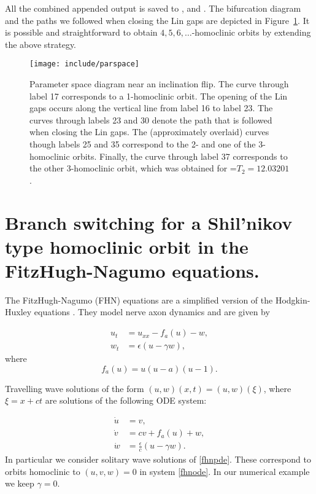 \documentclass[12pt]{report}
\begin{document}
All the combined appended output is saved to , 
and .
The bifurcation diagram and the paths we followed when closing the Lin
gaps are depicted in Figure~\ref{parspace}. It is possible and
straightforward to obtain $4, 5, 6, \dots$-homoclinic orbits by 
extending the above strategy.
\begin{figure}[htb]
\begin{center}
\texttt{[image: include/parspace]}
\caption{Parameter space diagram near an inclination flip. 
The curve
through label 17 corresponds to a 1-homoclinic orbit. 
The opening of the Lin gaps occurs along the vertical line from
label 16 to label 23. The curves
through labels 23 and 30 denote the path that is followed when
closing the Lin gaps. The (approximately overlaid)
curves though labels 25 and 35 correspond to the 
2- and one of the 3-homoclinic orbits.
Finally, the curve through label 37 corresponds to the other
3-homoclinic orbit, which was obtained for =$T_2=12.03201$.}
\label{parspace}
\end{center}
\end{figure}

\section{ Branch switching for a Shil'nikov type homoclinic orbit in
the FitzHugh-Nagumo equations.}

The FitzHugh-Nagumo (FHN) equations \cite{FitzH:61,NaArYo:62} 
are a simplified version of the
Hodgkin-Huxley equations \cite{HoHu:52}. 
They model nerve axon dynamics and are given by

\begin{equation}
\begin{split}
u_t&=u_{xx}-f_a(u)-w, \\
w_t&=\epsilon(u-\gamma w),
\end{split}
\label{fhnpde}
\end{equation}
where
\[
f_a(u) = u (u-a)(u-1).
\]

Travelling wave solutions of the form $(u,w)(x,t)=(u,w)(\xi)$, where
$\xi=x+ct$ are solutions of the following ODE system:

\begin{equation}
\begin{split}
\dot u &= v,\\
\dot v &= c v + f_a(u) + w,\\
\dot w &= \frac{\epsilon}{c} (u - \gamma w).
\end{split}
\label{fhnode}
\end{equation}
In particular we consider solitary wave solutions of \eqref{fhnpde}.
These correspond to orbits homoclinic to $(u,v,w)=0$ in system \eqref{fhnode}.
In our numerical example we keep $\gamma=0$.
\end{document}
